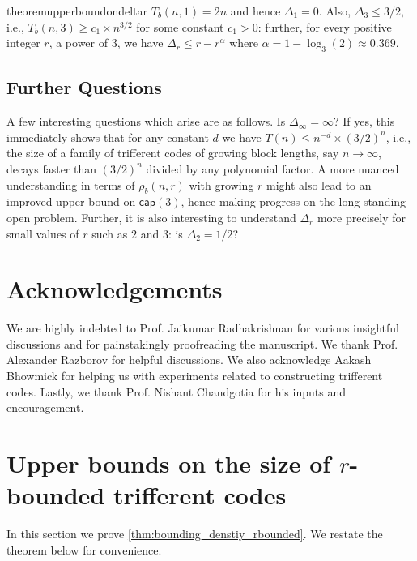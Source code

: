 \documentclass[10pt,a4paper]{article}
\newcommand{\rbdtrifferentcodes}{$r$-bounded trifferent code}
\newcommand{\bcap}{\mathsf{cap}}
\DeclareMathOperator{\1}{\mathbf{1}}
\begin{document}
\begin{restatable}{theorem}{upperboundondeltar}
\label{thm:upper_bound_on_deltar}
    $T_b(n,1)= 2n$ and hence $\Delta_1 =0$. 
Also, $\Delta_3 \leq 3/2$, i.e., $T_b(n,3)\geq c_1\times n^{3/2}$ for some constant $c_1>0$: further, for every positive integer $r$, a power of $3$, we have $\Delta_r\leq r-r^{\alpha}$ where $\alpha = 1- \log_{3}(2) \approx 0.369$.
\end{restatable}

\subsection*{Further Questions}

A few interesting questions which arise are as follows. Is $\Delta_\infty = \infty$? If yes, this immediately shows that for any constant $d$ we have $T(n)\leq n^{-d}\times (3/2)^n$, i.e., the size of a family of trifferent codes of growing block lengths, say $n \to \infty$, decays faster than $(3/2)^n$ divided by any polynomial factor.
A more nuanced understanding in terms of $\rho_b(n,r)$ with growing $r$ might also lead to an improved upper bound on $\bcap(3)$, hence making progress on the long-standing open problem.
Further, it is also interesting to understand $\Delta_r$ more precisely for small values of $r$ such as $2$ and $3$: is $\Delta_2=1/2$?



\section*{Acknowledgements}
    We are highly indebted to Prof. Jaikumar Radhakrishnan for various insightful discussions and for painstakingly proofreading the manuscript. 
We thank Prof. Alexander Razborov for helpful discussions. 
We also acknowledge Aakash Bhowmick for helping us with experiments related to constructing trifferent codes. 
Lastly, we thank Prof. Nishant Chandgotia for his inputs and encouragement.



\section{Upper bounds on the size of \rbdtrifferentcodes{s}}
\label{sec:upper_bd_rbdtrifferentcodes}

In this section we prove \cref{thm:bounding_denstiy_rbounded}.
We restate the theorem below for convenience. 
\end{document}

